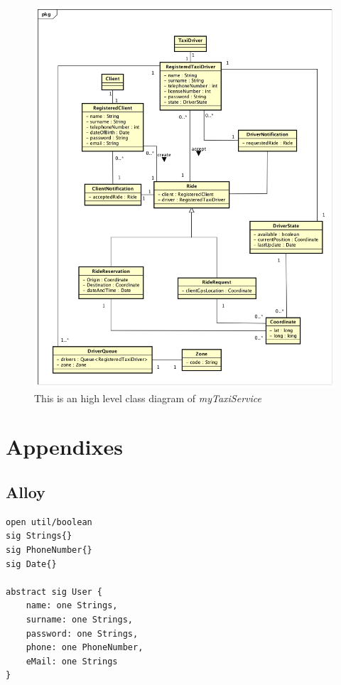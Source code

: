 \documentclass[a4paper]{article}
\begin{document}
\begin{enumerate}[label=\bfseries G\arabic*:]
\begin{figure}[H]
\includegraphics[width=\sequenceWidth]{ClassDiagramMyTaxiService}
\centering
\caption[UML Class Diagram]{This is an high level class diagram of \emph{myTaxiService}}
\label{fig:classdiagram}
\end{figure}

\section{Appendixes}

\subsection{Alloy}

\begin{lstlisting}[language=alloy]
open util/boolean
sig Strings{}
sig PhoneNumber{}
sig Date{}

abstract sig User {
	name: one Strings,
	surname: one Strings,
	password: one Strings,
	phone: one PhoneNumber,
	eMail: one Strings
}
\end{lstlisting}


\end{enumerate}
\end{document}
